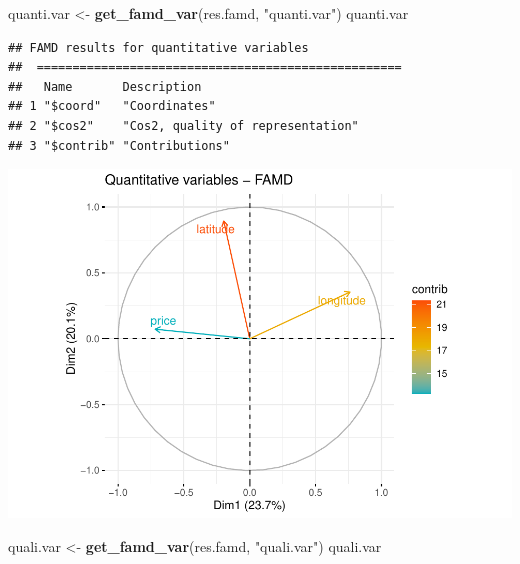 \documentclass[
]{article}
\newenvironment{Shaded}{\begin{snugshade}}{\end{snugshade}}
\newcommand{\DataTypeTok}[1]{\textcolor[rgb]{0.13,0.29,0.53}{#1}}
\newcommand{\KeywordTok}[1]{\textcolor[rgb]{0.13,0.29,0.53}{\textbf{#1}}}
\newcommand{\NormalTok}[1]{#1}
\newcommand{\OtherTok}[1]{\textcolor[rgb]{0.56,0.35,0.01}{#1}}
\newcommand{\StringTok}[1]{\textcolor[rgb]{0.31,0.60,0.02}{#1}}
\begin{document}
\begin{Shaded}
\begin{Highlighting}[]
\NormalTok{quanti.var <-}\StringTok{ }\KeywordTok{get_famd_var}\NormalTok{(res.famd, }\StringTok{"quanti.var"}\NormalTok{)}
\NormalTok{quanti.var}
\end{Highlighting}
\end{Shaded}

\begin{verbatim}
## FAMD results for quantitative variables 
##  ===================================================
##   Name       Description                      
## 1 "$coord"   "Coordinates"                    
## 2 "$cos2"    "Cos2, quality of representation"
## 3 "$contrib" "Contributions"
\end{verbatim}

\begin{Shaded}
\end{Shaded}

\includegraphics{project-code_files/figure-latex/unnamed-chunk-34-1.pdf}

\begin{Shaded}
\begin{Highlighting}[]
\NormalTok{quali.var <-}\StringTok{ }\KeywordTok{get_famd_var}\NormalTok{(res.famd, }\StringTok{"quali.var"}\NormalTok{)}
\NormalTok{quali.var }
\end{Highlighting}
\end{Shaded}
\end{document}
